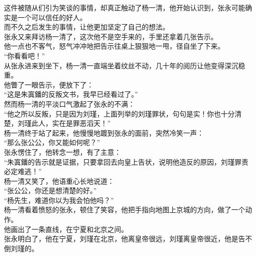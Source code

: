 \begin{multicols}{\theparacolNo}
这件被随从们引为笑谈的事情，却真正触动了杨一清，他开始认识到，张永可能确实是一个可以信任的好人。\\

而不久之后发生的事情，让他更加坚定了自己的想法。\\

张永又来拜访杨一清了，这次他不是空手来的，手里还拿着几张告示。\\

他一点也不客气，怒气冲冲地把告示往桌上狠狠地一甩，径自坐了下来。\\

“你看看吧！”\\

从张永进来到坐下，杨一清一直端坐着纹丝不动，几十年的阅历让他变得深沉稳重。\\

他瞥了一眼告示，便放下了：\\

“这是朱寘鐇的反叛文书，我早已经看过了。”\\

然而杨一清的平淡口气激起了张永的不满：\\

“他之所以反叛，只是因为刘瑾，上面列举的刘瑾罪状，句句是实！你也十分清楚，刘瑾此人，实在是罪恶滔天！”\\

杨一清终于站了起来，他慢慢地踱到张永的面前，突然冷笑一声：\\

“那么张公公，你又能如何呢？”\\

张永愣住了，他转念一想，有了主意：\\

“朱寘鐇的告示就是证据，只要拿回去向皇上告状，说明他造反的原因，刘瑾罪责必定难逃！”\\

杨一清又笑了，他语重心长地说道：\\

“张公公，你还是想清楚的好。”\\

“杨先生，难道你以为我会怕他吗？”\\

杨一清看着愤怒的张永，顿住了笑容，他把手指向地图上京城的方向，做了一个动作。\\

他画出了一条直线，在宁夏和北京之间。\\

张永明白了，他在宁夏，刘瑾在北京，他离皇帝很远，刘瑾离皇帝很近，他是告不倒刘瑾的。\\


\end{multicols}
